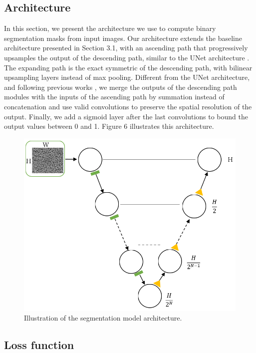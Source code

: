 \documentclass[10pt,twocolumn,letterpaper]{article}
\begin{document}
\subsection{Architecture}
% 
In this section, we present the architecture we use 
to compute binary segmentation masks from input images.
Our architecture extends the baseline architecture presented in Section 3.1,
with an ascending path that progressively upsamples the output
of the descending path, similar to the UNet architecture \cite{}.
The expanding path is the exact symmetric of the descending path,
with bilinear upsampling layers instead of max pooling.
Different from the UNet architecture, and following previous works \cite{},
we merge the outputs of the descending path modules with the inputs of the ascending path 
by summation instead of concatenation and use valid convolutions 
to preserve the spatial resolution of the output.
Finally, we add a sigmoid layer after the last convolutions to bound the output values between 0 and 1.
Figure 6 illustrates this architecture.

\begin{figure}[h]
	\centering
	\includegraphics[width=0.9\linewidth]{"./figures/Figure6"}
	\caption{
		Illustration of the segmentation model architecture.
	}
\end{figure}

\subsection{Loss function}
\end{document}
